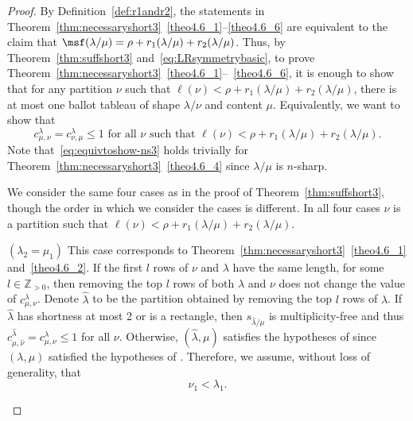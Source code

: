 \begin{proof}
By Definition~\ref{def:r1andr2}, the statements in Theorem~\ref{thm:necessaryshort3}~\ref{theo4.6_1}--\ref{theo4.6_6} are equivalent to the claim that $\msf (\lambda/\mu)=\rho + r_1(\lambda / \mu) + r_2 (\lambda / \mu)$. Thus, by Theorem~\ref{thm:suffshort3} and~\eqref{eq:LRsymmetrybasic}, to prove Theorem~\ref{thm:necessaryshort3}~\ref{theo4.6_1}--~\ref{theo4.6_6}, it is enough to show that for any partition $\nu$ such that $\ell(\nu) < \rho + r_1(\lambda / \mu) + r_2 (\lambda / \mu)$, there is at most one ballot tableau of shape $\lambda/\nu$ and content $\mu$. Equivalently, we want to show that
\begin{equation}
\label{eq:equivtoshow-ns3}
c^{\lambda}_{\mu,\nu} = c^{\lambda}_{\nu,\mu}\leq 1\text{ for all }\nu\text{ such that } \ell(\nu) < \rho + r_1(\lambda / \mu) + r_2 (\lambda / \mu).
\end{equation}
Note that~\eqref{eq:equivtoshow-ns3} holds trivially for Theorem~\ref{thm:necessaryshort3}~\ref{theo4.6_4} since $\lambda/ \mu$ is $n$-sharp.


We consider the same four cases as in the proof of Theorem~\ref{thm:suffshort3}, though the order in which we consider the cases is different. In all four cases $\nu$ is a partition such that $\ell(\nu) < \rho + r_1(\lambda / \mu) + r_2 (\lambda / \mu)$.

\begin{Case}
{ $(\lambda_2 = \mu_1)$} This case corresponds to Theorem~\ref{thm:necessaryshort3}~\ref{theo4.6_1} and~\ref{theo4.6_2}. If the first $l$ rows of $\nu$ and $\lambda$ have the same length, for some $l\in \mathbb{Z}_{>0}$, then removing the top $l$ rows of both $\lambda$ and $\nu$ does not change the value of $c^\lambda_{\mu,\nu}$. Denote $\widehat \lambda$ to be the partition obtained by removing the top $l$ rows of $\lambda$. If $\widehat \lambda$ has shortness at most 2 or is a rectangle, then $s_{\widehat \lambda/\mu}$ is multiplicity-free and thus $c^{\widehat \lambda}_{\mu,\widehat \nu} = c^\lambda_{\mu,\nu} \leq 1$ for all $\nu$. Otherwise, $(\widehat \lambda,\mu)$ satisfies the hypotheses of  since $(\lambda,\mu)$ satisfied the hypotheses of .
Therefore, we assume, without loss of generality, that 
\begin{equation}
\label{eq:nu1<la1}
 \nu_1<\lambda_1.
\end{equation}


\end{Case}
\end{proof}
